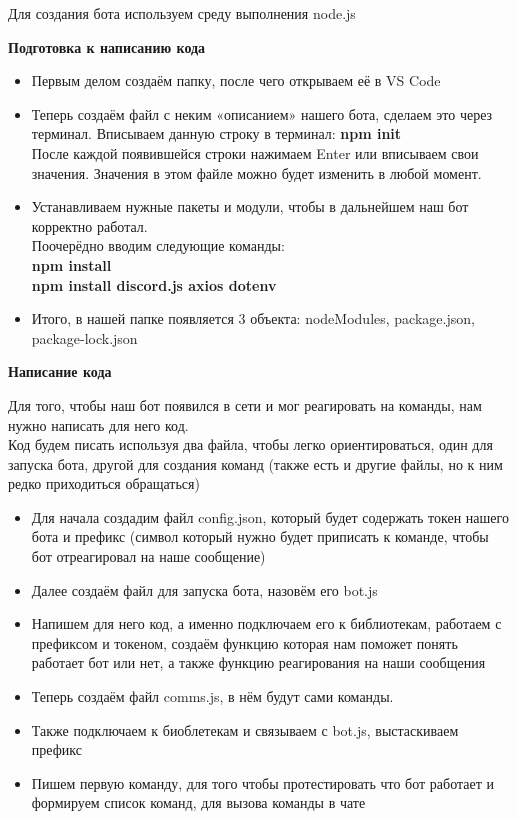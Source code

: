 \documentclass[a4paper,12pt]{article}
\begin{document}
\noindent
Для создания бота используем среду выполнения node.js \\

\noindent
\begin{center}
\textbf{Подготовка к написанию кода}\\
\end{center}
\begin{itemize}
    \item Первым делом создаём папку, после чего открываем её в VS Code
    \item Теперь создаём файл с неким «описанием» нашего бота, сделаем это через терминал.
    Вписываем данную строку в терминал: \textbf{npm init} \\
    После каждой появившейся строки нажимаем Enter или вписываем свои значения.
    Значения в этом файле можно будет изменить в любой момент.
    \item Устанавливаем нужные пакеты и модули, чтобы в дальнейшем наш бот корректно работал. \\
    Поочерёдно вводим следующие команды: \textbf{ \\npm install \\ npm install discord.js axios dotenv}
    \item Итого, в нашей папке появляется 3 объекта: nodeModules, package.json, package-lock.json
\end{itemize}

\newpage
\begin{center}
\textbf{Написание кода}\\
\end{center}

Для того, чтобы наш бот появился в сети и мог реагировать на команды, нам нужно написать для него код.\\

Код будем писать используя два файла, чтобы легко ориентироваться, один для запуска бота, другой для создания команд (также есть и другие файлы, но к ним редко приходиться обращаться) \\

\begin{itemize}
    \item Для начала создадим файл config.json, который будет содержать токен нашего бота и префикс (символ который нужно будет приписать к команде, чтобы бот отреагировал на наше сообщение)
    \item Далее создаём файл для запуска бота, назовём его bot.js
    \item Напишем для него код, а именно подключаем его к библиотекам, работаем с префиксом и токеном, создаём функцию которая нам поможет понять работает бот или нет, а также функцию реагирования на наши сообщения
    \item Теперь создаём файл comms.js, в нём будут сами команды.
    \item Также подключаем к биоблетекам и связываем с bot.js, выстаскиваем префикс
    \item Пишем первую команду, для того чтобы протестировать что бот работает и формируем список команд, для вызова команды в чате
\end{itemize}
\end{document}
